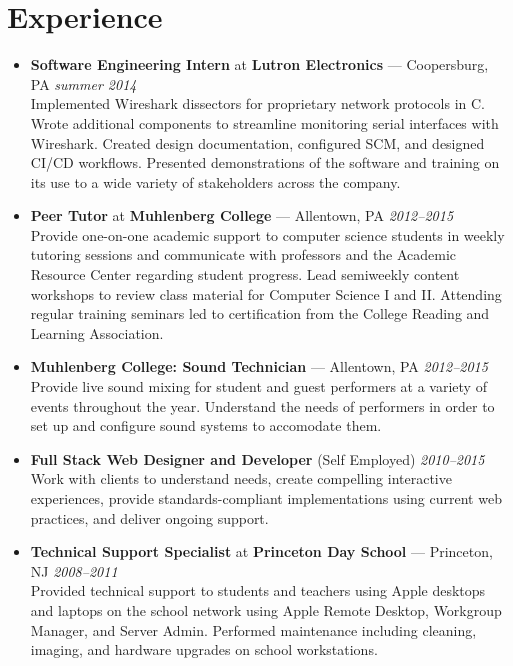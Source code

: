 \documentclass[11pt]{article}
\begin{document}
\section*{Experience}
\begin{itemize}
  \item \textbf{Software Engineering Intern} at \textbf{Lutron Electronics} --- Coopersburg, PA \hfill {\em summer 2014} \\
    Implemented Wireshark dissectors for proprietary network protocols in C. Wrote additional components to streamline monitoring serial interfaces with Wireshark. Created design documentation, configured SCM, and designed CI/CD workflows. Presented demonstrations of the software and training on its use to a wide variety of stakeholders across the company.

  \item \textbf{Peer Tutor} at \textbf{Muhlenberg College} --- Allentown, PA \hfill {\em 2012--2015} \\
    Provide one-on-one academic support to computer science students in weekly tutoring sessions and communicate with professors and the Academic Resource Center regarding student progress. Lead semiweekly content workshops to review class material for Computer Science I and II. Attending regular training seminars led to certification from the College Reading and Learning Association.

  \item \textbf{Muhlenberg College: Sound Technician} --- Allentown, PA \hfill {\em 2012--2015} \\
    Provide live sound mixing for student and guest performers at a variety of events throughout the year. Understand the needs of performers in order to set up and configure sound systems to accomodate them.

  \item \textbf{Full Stack Web Designer and Developer} (Self Employed) \hfill {\em 2010--2015} \\
    Work with clients to understand needs, create compelling interactive experiences, provide standards-compliant implementations using current web practices, and deliver ongoing support.

  \item \textbf{Technical Support Specialist} at \textbf{Princeton Day School} --- Princeton, NJ \hfill {\em 2008--2011} \\
    Provided technical support to students and teachers using Apple desktops and laptops on the school network using Apple Remote Desktop, Workgroup Manager, and Server Admin. Performed maintenance including cleaning, imaging, and hardware upgrades on school workstations.
\end{itemize}
\end{document}
